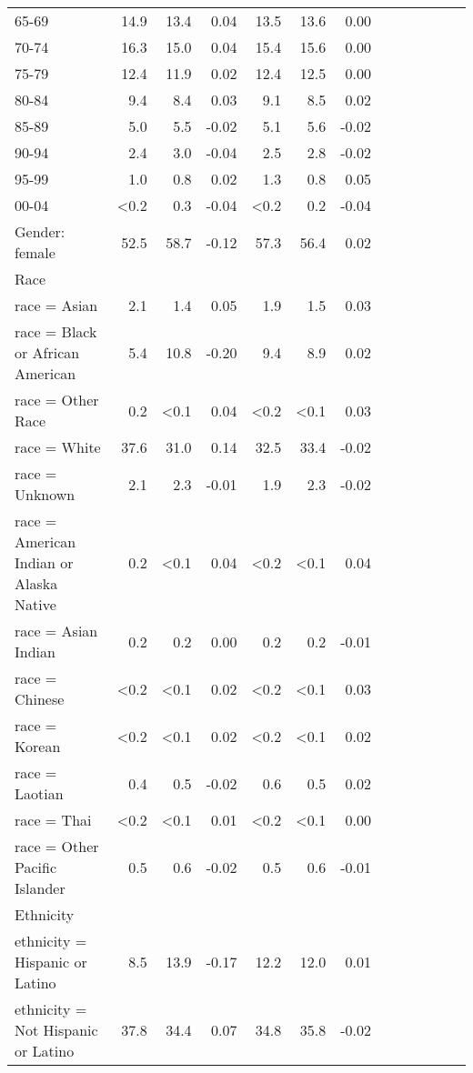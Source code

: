 \documentclass[11pt,]{article}
\begin{document}
\begin{longtable}{lrrrrrrrrrrrr}
      65-69 & 14.9 & 13.4 &  0.04 & 13.5 & 13.6 &  0.00 \\ 
      70-74 & 16.3 & 15.0 &  0.04 & 15.4 & 15.6 &  0.00 \\ 
      75-79 & 12.4 & 11.9 &  0.02 & 12.4 & 12.5 &  0.00 \\ 
      80-84 &  9.4 &  8.4 &  0.03 &  9.1 &  8.5 &  0.02 \\ 
      85-89 &  5.0 &  5.5 & -0.02 &  5.1 &  5.6 & -0.02 \\ 
      90-94 &  2.4 &  3.0 & -0.04 &  2.5 &  2.8 & -0.02 \\ 
      95-99 &  1.0 &  0.8 &  0.02 &  1.3 &  0.8 &  0.05 \\ 
      00-04 & <0.2 &  0.3 & -0.04 & <0.2 &  0.2 & -0.04 \\ 
  Gender: female & 52.5 & 58.7 & -0.12 & 57.3 & 56.4 &  0.02 \\ 
  Race &    &    &     &    &    &     \\ 
      race = Asian &  2.1 &  1.4 &  0.05 &  1.9 &  1.5 &  0.03 \\ 
      race = Black or African American &  5.4 & 10.8 & -0.20 &  9.4 &  8.9 &  0.02 \\ 
      race = Other Race &  0.2 & <0.1 &  0.04 & <0.2 & <0.1 &  0.03 \\ 
      race = White & 37.6 & 31.0 &  0.14 & 32.5 & 33.4 & -0.02 \\ 
      race = Unknown &  2.1 &  2.3 & -0.01 &  1.9 &  2.3 & -0.02 \\ 
      race = American Indian or Alaska Native &  0.2 & <0.1 &  0.04 & <0.2 & <0.1 &  0.04 \\ 
      race = Asian Indian &  0.2 &  0.2 &  0.00 &  0.2 &  0.2 & -0.01 \\ 
      race = Chinese & <0.2 & <0.1 &  0.02 & <0.2 & <0.1 &  0.03 \\ 
      race = Korean & <0.2 & <0.1 &  0.02 & <0.2 & <0.1 &  0.02 \\ 
      race = Laotian &  0.4 &  0.5 & -0.02 &  0.6 &  0.5 &  0.02 \\ 
      race = Thai & <0.2 & <0.1 &  0.01 & <0.2 & <0.1 &  0.00 \\ 
      race = Other Pacific Islander &  0.5 &  0.6 & -0.02 &  0.5 &  0.6 & -0.01 \\ 
  Ethnicity &    &    &     &    &    &     \\ 
      ethnicity = Hispanic or Latino &  8.5 & 13.9 & -0.17 & 12.2 & 12.0 &  0.01 \\ 
      ethnicity = Not Hispanic or Latino & 37.8 & 34.4 &  0.07 & 34.8 & 35.8 & -0.02 \\ 

\end{longtable}
\end{document}
